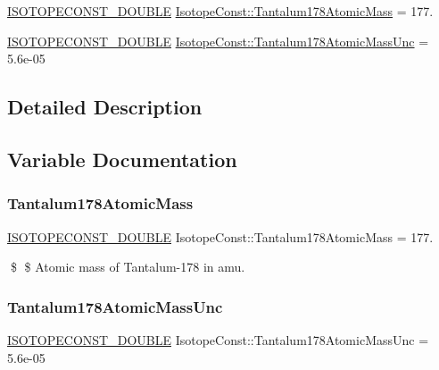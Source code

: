 \begin{DoxyCompactItemize}
\item 
\mbox{\hyperlink{group___isotope_const-_macros_ga8f45a7272ce02c0b4c65c44636ed719a}{I\+S\+O\+T\+O\+P\+E\+C\+O\+N\+S\+T\+\_\+\+D\+O\+U\+B\+LE}} \mbox{\hyperlink{group___isotope_const-_tantalum-_ta178_ga6662fac3a1bb2676211fc21735a643bc}{Isotope\+Const\+::\+Tantalum178\+Atomic\+Mass}} = 177.
\item 
\mbox{\hyperlink{group___isotope_const-_macros_ga8f45a7272ce02c0b4c65c44636ed719a}{I\+S\+O\+T\+O\+P\+E\+C\+O\+N\+S\+T\+\_\+\+D\+O\+U\+B\+LE}} \mbox{\hyperlink{group___isotope_const-_tantalum-_ta178_ga8ab11e513819d3d2a462105a46cf1979}{Isotope\+Const\+::\+Tantalum178\+Atomic\+Mass\+Unc}} = 5.\+6e-\/05
\end{DoxyCompactItemize}


\subsection{Detailed Description}


\subsection{Variable Documentation}
\mbox{\label{group___isotope_const-_tantalum-_ta178_ga6662fac3a1bb2676211fc21735a643bc}} 
\subsubsection{\texorpdfstring{Tantalum178\+Atomic\+Mass}{Tantalum178AtomicMass}}
{\footnotesize\ttfamily \mbox{\hyperlink{group___isotope_const-_macros_ga8f45a7272ce02c0b4c65c44636ed719a}{I\+S\+O\+T\+O\+P\+E\+C\+O\+N\+S\+T\+\_\+\+D\+O\+U\+B\+LE}} Isotope\+Const\+::\+Tantalum178\+Atomic\+Mass = 177.}

\$ \$ Atomic mass of Tantalum-\/178 in amu. \mbox{\label{group___isotope_const-_tantalum-_ta178_ga8ab11e513819d3d2a462105a46cf1979}} 
\subsubsection{\texorpdfstring{Tantalum178\+Atomic\+Mass\+Unc}{Tantalum178AtomicMassUnc}}
{\footnotesize\ttfamily \mbox{\hyperlink{group___isotope_const-_macros_ga8f45a7272ce02c0b4c65c44636ed719a}{I\+S\+O\+T\+O\+P\+E\+C\+O\+N\+S\+T\+\_\+\+D\+O\+U\+B\+LE}} Isotope\+Const\+::\+Tantalum178\+Atomic\+Mass\+Unc = 5.\+6e-\/05}

